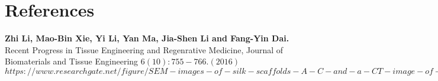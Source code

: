 \documentclass[12pt]{article}
\begin{document}
\centering
\section{References}
\raggedright
\textbf{Zhi Li, Mao-Bin Xie, Yi Li, Yan Ma, Jia-Shen Li and Fang-Yin Dai.} Recent Progress in Tissue Engineering and Regenrative Medicine, Journal of Biomaterials and Tissue Engineering $6(10):755-766. (2016)$
\linebreak
\linebreak
$https://www.researchgate.net/figure/SEM-images-of-silk-scaffolds-A-C-and-a-CT-image-of-a-cynomolgus-monkey-L1-vertebra_fig9_6313407$
\end{document}
